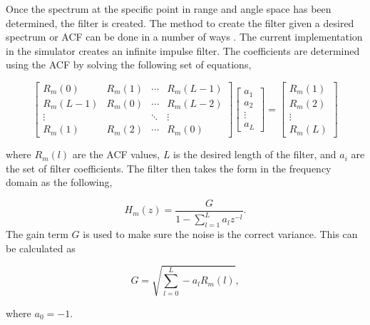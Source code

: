 \documentclass[draft,ras]{agutex}
\begin{document}
\begin{article}

Once the spectrum at the specific point in range and angle space has been determined, the filter is created. The method to create the filter given a desired spectrum or ACF can be done in a number of ways \cite{Kasdin:1995wi}. The current implementation in the simulator creates an infinite impulse filter. The coefficients are determined using the ACF by solving the following set of equations,

\begin{equation}
\label{eq:filtereq}
\begin{bmatrix} R_m(0) & R_m(1)& \cdots & R_m(L-1) \\ R_m(L-1) & R_m(0)& \cdots & R_m(L-2)\\ \vdots & &\ddots  & \vdots \\  R_m(1) & R_m(2) & \cdots & R_m(0) \end{bmatrix} \left[ \begin{array}{c} a_1\\ a_2\\\vdots \\ a_L \end{array} \right]=\left[ \begin{array}{c} R_m(1) \\ R_m(2)\\ \vdots \\R_m(L) \end{array} \right]
\end{equation}

\noindent where $R_m(l)$ are the ACF values, $L$ is the desired length of the filter, and $ a_i$ are the set of filter coefficients. The filter then takes the form in the frequency domain as the following,

\begin{equation}
\label{eq:filtz}
H_m(z) = \frac{G}{1-\displaystyle \sum_{l=1}^{L} a_l z^{-l}}.
\end{equation}
\noindent The gain term $G$ is used to make sure the noise is the correct variance. This can be calculated as 

\begin{equation}
\label{eq:gainterm}
G=\sqrt{\displaystyle \sum_{l=0}^L -a_l R_m(l)},
\end{equation}

\noindent where $a_0=-1$. 


\end{article}
\end{document}
